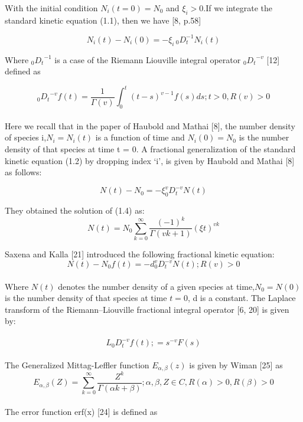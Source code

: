 \documentclass{article}
\begin{document}
With the initial condition $N_i (t=0) = N_0$ and $\xi _i > 0$.If we integrate the standard kinetic equation (1.1), then we have [8, p.58]

\begin{equation}
N_i (t) - N_i (0) = -\xi _{i}\,{_0 D_t^{-1}}N_i (t)
\end{equation}


Where ${_0 D_t}^{-1}$ is a case of the Riemann \- Liouville integral operator ${_0 D_t}^{-v}$ [12] defined as

\begin{equation}
    {_0 D_t}^{-v} f (t) = \frac{1}{\Gamma{(v)}}
    \int_0^t(t - s)^{v-1}
    f(s)ds;
    t > 0,
    R(v) > 0 
\end{equation}

\paragraph{}
Here we recall that in the paper of Haubold and Mathai [8], the number density of species i,$N_i = N_i (t)$ is a function of time and $N_i (0) = N_0$ is the number density of that species at time t = 0.
A fractional generalization of the standard kinetic equation (1.2) by dropping index ‘i’, is given by Haubold and Mathai [8] as follows:

\begin{equation}
    N(t) - N_0
    =-\xi ^v_0
    D^{-v}_t
    N (t)
\end{equation}

They obtained the solution of (1.4) as:
\begin{equation}
    N(t) 
    =N_0
    \sum_{k=0}^\infty 
    \frac{(-1)^k}{\Gamma{(vk+1)}}(\xi t)^{vk}
\end{equation}

Saxena and Kalla [21] introduced the following fractional kinetic equation:
\begin{equation}
    N(t) - N_0f(t)
    =-d ^v_0
    D^{-v}_t
    N (t)
    ;R(v) > 0
\end{equation}
\paragraph{}
Where $N(t)$ denotes the number density of a given species at time,$N_0 = N(0)$ is the number density of that species at time $t = 0$, d is a constant.
The Laplace transform of the Riemann–Liouville fractional integral operator [6, 20] is given by:
\\
\\
\begin{equation}
L_0D_t^{-v}f(t);=s^{-v}F(s)
\end{equation}
\\
The Generalized Mittag-Leffler function $E_{\alpha , \beta}(z)$ is given by Wiman [25] as
\\ 
\begin{equation}
    E_{\alpha , \beta}(Z) 
    = \sum_{k = 0}^{\infty}
    \frac{Z^k}{\Gamma{(\alpha k + \beta)}};
    \alpha ,
    \beta ,
    Z \in C,
    R(\alpha) > 0,
    R(\beta) > 0
\end{equation}
\\ 
The error function erf(x) [24] is defined as 
\end{document}
